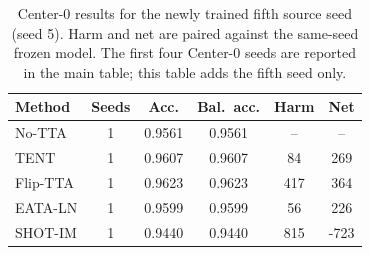 \begin{table}[t]
\centering
\small
\caption{Center-0 results for the newly trained fifth source seed (seed 5). Harm and net are paired against the same-seed frozen model. The first four Center-0 seeds are reported in the main table; this table adds the fifth seed only.}
\label{tab:center0-seed5}
\begin{tabular}{@{}lccccc@{}}
\toprule
Method & Seeds & Acc. & Bal.\ acc. & Harm & Net \\
\midrule
No-TTA & 1 & 0.9561 & 0.9561 & -- & -- \\
TENT & 1 & 0.9607 & 0.9607 & 84 & 269 \\
Flip-TTA & 1 & 0.9623 & 0.9623 & 417 & 364 \\
EATA-LN & 1 & 0.9599 & 0.9599 & 56 & 226 \\
SHOT-IM & 1 & 0.9440 & 0.9440 & 815 & -723 \\
\bottomrule
\end{tabular}
\end{table}
